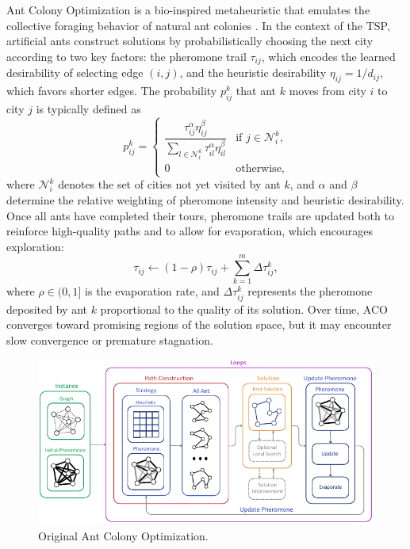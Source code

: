 \documentclass[a4paper,conference]{IEEEtran}
\newcommand{\calN}{\mathcal{N}}
\begin{document}
Ant Colony Optimization is a bio-inspired metaheuristic that emulates the collective foraging behavior of natural ant colonies \cite{ACO}. In the context of the TSP, artificial ants construct solutions by probabilistically choosing the next city according to two key factors: the pheromone trail $\tau_{ij}$, which encodes the learned desirability of selecting edge $(i,j)$, and the heuristic desirability $\eta_{ij}=1/d_{ij}$, which favors shorter edges. The probability $p_{ij}^k$ that ant $k$ moves from city $i$ to city $j$ is typically defined as
\begin{equation}
 p_{ij}^k = \begin{cases}
 \dfrac{\tau_{ij}^\alpha \eta_{ij}^\beta}{\sum_{l\in\calN_i^k} \tau_{il}^\alpha \eta_{il}^\beta} & \text{if } j\in\calN_i^k, \\
 0 & \text{otherwise,}
 \end{cases}
\end{equation}
where $\calN_i^k$ denotes the set of cities not yet visited by ant $k$, and $\alpha$ and $\beta$ determine the relative weighting of pheromone intensity and heuristic desirability. Once all ants have completed their tours, pheromone trails are updated both to reinforce high-quality paths and to allow for evaporation, which encourages exploration:
\begin{equation}
\tau_{ij} \leftarrow (1-\rho)\tau_{ij} + \sum_{k=1}^m \Delta\tau_{ij}^k,
\end{equation}
where $\rho\in(0,1]$ is the evaporation rate, and $\Delta\tau_{ij}^k$ represents the pheromone deposited by ant $k$ proportional to the quality of its solution. Over time, ACO converges toward promising regions of the solution space, but it may encounter slow convergence or premature stagnation.

\begin{figure}[!tb]
  \centering
  \includegraphics[width=\linewidth]{ACO.pdf}
  \caption{Original Ant Colony Optimization.}
  \label{fig:ACO}
\end{figure}
\end{document}
